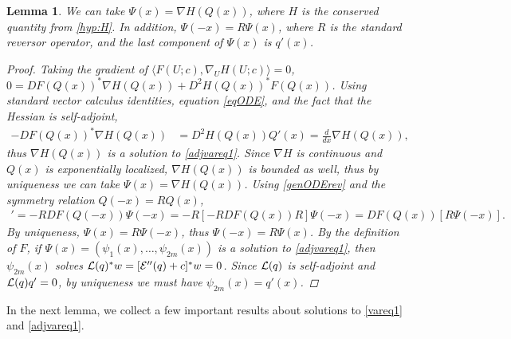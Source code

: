 \documentclass[10pt,reqno]{amsart}
\theoremstyle{plain}
\newtheorem{lemma}[theorem]{Lemma}
\theoremstyle{definition}
\theoremstyle{remark}
\numberwithin{theorem}{section}
\numberwithin{equation}{section}
\begin{document}
\begin{lemma}\label{psiform}
We can take $\Psi(x) = \nabla H(Q(x))$, where $H$ is the conserved quantity from \cref{hyp:H}. In addition, $\Psi(-x) = R \Psi(x)$, where $R$ is the standard reversor operator, and the last component of $\Psi(x)$ is $q'(x)$.
\begin{proof}
Taking the gradient of $\langle F(U; c), \nabla_U H(U; c) \rangle = 0$, $0 = D F(Q(x))^* \nabla H(Q(x)) + D^2 H(Q(x))^* F(Q(x))$. Using standard vector calculus identities, equation \cref{eqODE}, and the fact that the Hessian is self-adjoint,
\begin{align*}
-D F(Q(x))^* \nabla H(Q(x)) &= D^2 H(Q(x)) Q'(x) = \frac{d}{dx} \nabla H(Q(x)),
\end{align*}
thus $\nabla H(Q(x))$ is a solution to \eqref{adjvareq1}. Since $\nabla H$ is continuous and $Q(x)$ is exponentially localized, $\nabla H(Q(x))$ is bounded as well, thus by uniqueness we can take $\Psi(x) = \nabla H(Q(x))$. Using \eqref{genODErev} and the symmetry relation $Q(-x) = R Q(x)$, 
\begin{align*}
[R \Psi(-x)]' = -R DF(Q(-x)) \Psi(-x) 
= -R [-RDF(Q(x))R] \Psi(-x) = DF(Q(x))[ R \Psi(-x) ].
\end{align*}
By uniqueness, $\Psi(x) = R \Psi(-x)$, thus $\Psi(-x) = R \Psi(x)$. By the definition of $F$, if $\Psi(x) = (\psi_1(x), \dots, \psi_{2m}(x))$ is a solution to \cref{adjvareq1}, then $\psi_{2m}(x)$ solves $\mathcal{L}(q)^* w = [\mathcal{E}''(q) + c]^* w = 0$. Since $\mathcal{L}(q)$ is self-adjoint and $\mathcal{L}(q)q' = 0$, by uniqueness we must have $\psi_{2m}(x) = q'(x)$.
\end{proof}
\end{lemma}

In the next lemma, we collect a few important results about solutions to \cref{vareq1} and \cref{adjvareq1}.
\end{document}
